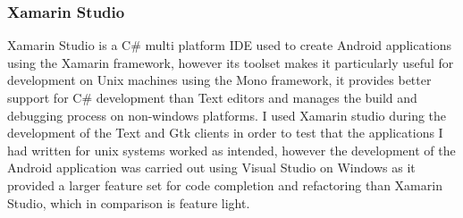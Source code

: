 \documentclass{article}
\begin{document}
\subsubsection{Xamarin Studio}
Xamarin Studio is a C\# multi platform IDE used to create Android applications using the Xamarin framework, however its toolset makes it particularly useful for development on Unix machines using the Mono framework, it provides better support for C\# development than Text editors and manages the build and debugging process on non-windows platforms. I used Xamarin studio during the development of the Text and Gtk clients in order to test that the applications I had written for unix systems worked as intended, however the development of the Android application was carried out using Visual Studio on Windows as it provided a larger feature set for code completion and refactoring than Xamarin Studio, which in comparison is feature light.
\end{document}
